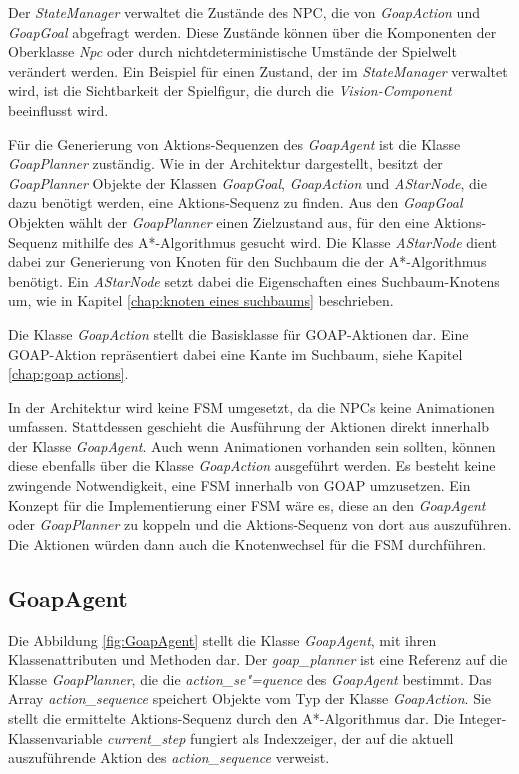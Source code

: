 Der \textit{StateManager} verwaltet die Zustände des NPC, die von \textit{GoapAction} und \textit{GoapGoal} abgefragt werden. Diese Zustände können über die Komponenten der Oberklasse \textit{Npc} oder durch nichtdeterministische Umstände der Spielwelt verändert werden. Ein Beispiel für einen Zustand, der im \textit{StateManager} verwaltet wird, ist die Sichtbarkeit der Spielfigur, die durch die \textit{Vision-Component} beeinflusst wird.

Für die Generierung von Aktions-Sequenzen des \textit{GoapAgent} ist die Klasse \textit{GoapPlanner} zuständig. Wie in der Architektur dargestellt, besitzt der \textit{GoapPlanner} Objekte der Klassen \textit{GoapGoal}, \textit{GoapAction} und \textit{AStarNode}, die dazu benötigt werden, eine Aktions-Sequenz zu finden. Aus den \textit{GoapGoal} Objekten wählt der \textit{GoapPlanner} einen Zielzustand aus, für den eine Aktions-Sequenz mithilfe des A*-Algorithmus gesucht wird. Die Klasse \textit{AStarNode} dient dabei zur Generierung von Knoten für den Suchbaum die der A*-Algorithmus benötigt. Ein \textit{AStarNode} setzt dabei die Eigenschaften eines Suchbaum-Knotens um, wie in Kapitel \ref{chap:knoten eines suchbaums} beschrieben.

Die Klasse \textit{GoapAction} stellt die Basisklasse für GOAP-Aktionen dar. Eine GOAP-Aktion repräsentiert dabei eine Kante im Suchbaum, siehe Kapitel \ref{chap:goap actions}.

In der Architektur wird keine FSM umgesetzt, da die NPCs keine Animationen umfassen. Stattdessen geschieht die Ausführung der Aktionen direkt innerhalb der Klasse \textit{GoapAgent}. Auch wenn Animationen vorhanden sein sollten, können diese ebenfalls über die Klasse \textit{GoapAction} ausgeführt werden. Es besteht keine zwingende Notwendigkeit, eine FSM innerhalb von GOAP umzusetzen. Ein Konzept für die Implementierung einer FSM wäre es, diese an den \textit{GoapAgent} oder \textit{GoapPlanner} zu koppeln und die Aktions-Sequenz von dort aus auszuführen. Die Aktionen würden dann auch die Knotenwechsel für die FSM durchführen.








\subsection{GoapAgent}
\label{chap:goapagent uml}

Die Abbildung \ref{fig:GoapAgent} stellt die Klasse \textit{GoapAgent}, mit ihren Klassenattributen und Methoden dar. Der \textit{goap\_planner} ist eine Referenz auf die Klasse \textit{GoapPlanner}, die die \textit{action\_se"=quence} des \textit{GoapAgent} bestimmt. Das Array \textit{action\_sequence} speichert Objekte vom Typ der Klasse \textit{GoapAction}. Sie stellt die ermittelte Aktions-Sequenz durch den A*-Algorithmus dar. Die Integer-Klassenvariable \textit{current\_step} fungiert als Indexzeiger, der auf die aktuell auszuführende Aktion des \textit{action\_sequence} verweist.

